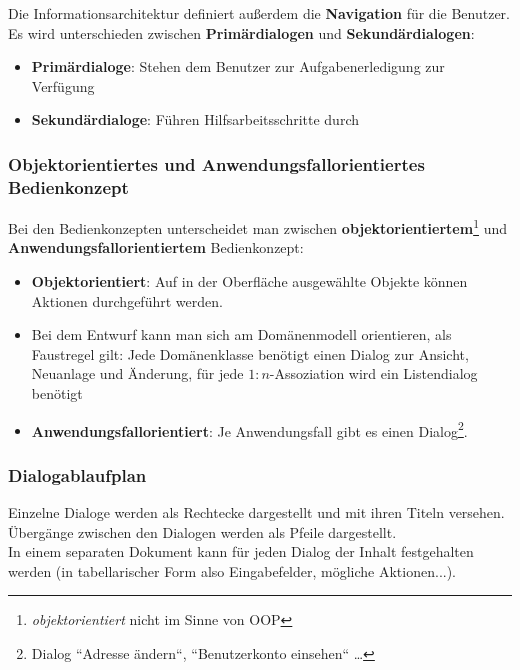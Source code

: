 \noindent
Die Informationsarchitektur definiert außerdem die \textbf{Navigation} für die Benutzer.\\

\noindent
Es wird unterschieden zwischen \textbf{Primärdialogen} und \textbf{Sekundärdialogen}:

\begin{itemize}
    \item \textbf{Primärdialoge}: Stehen dem Benutzer zur Aufgabenerledigung zur Verfügung
    \item \textbf{Sekundärdialoge}: Führen Hilfsarbeitsschritte durch
\end{itemize}

\subsubsection*{Objektorientiertes und Anwendungsfallorientiertes Bedienkonzept}
Bei den Bedienkonzepten unterscheidet man zwischen \textbf{objektorientiertem}\footnote{
\textit{objektorientiert} nicht im Sinne von OOP
} und \textbf{Anwendungsfallorientiertem} Bedienkonzept:

\begin{itemize}
    \item \textbf{Objektorientiert}: Auf in der Oberfläche ausgewählte Objekte können Aktionen durchgeführt werden.
    \item[] Bei dem Entwurf kann man sich am Domänenmodell orientieren, als Faustregel gilt: Jede Domänenklasse benötigt einen Dialog zur Ansicht, Neuanlage und Änderung, für jede $1:n$-Assoziation wird ein Listendialog benötigt
    \item \textbf{Anwendungsfallorientiert}: Je Anwendungsfall gibt es einen Dialog\footnote{
    Dialog ``Adresse ändern``, ``Benutzerkonto einsehen`` \ldots
    }.
\end{itemize}


\subsubsection*{Dialogablaufplan}
Einzelne Dialoge werden als Rechtecke dargestellt und mit ihren Titeln versehen.\\
Übergänge zwischen den Dialogen werden als Pfeile dargestellt.\\
In einem separaten Dokument kann für jeden Dialog der Inhalt festgehalten werden (in tabellarischer Form also Eingabefelder, mögliche Aktionen...).

